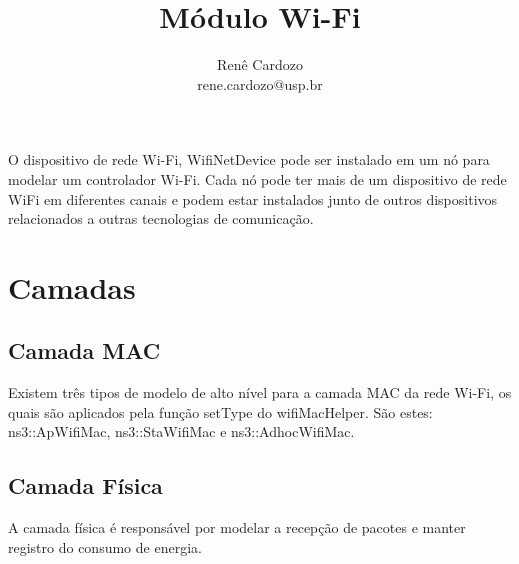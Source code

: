 \documentclass{article}
\author{Renê Cardozo \\ 
        rene.cardozo@usp.br}
\title{Módulo Wi-Fi}
\date{}
\begin{document}
\maketitle

O dispositivo de rede Wi-Fi, WifiNetDevice pode ser instalado em um nó para modelar um controlador Wi-Fi. Cada nó pode
ter mais de um dispositivo de rede WiFi em diferentes canais e podem estar instalados junto de outros dispositivos
relacionados a outras tecnologias de comunicação.

\section{Camadas}

\subsection{Camada MAC}
Existem três tipos de modelo de alto nível para a camada MAC da rede Wi-Fi, os quais são aplicados pela função setType
do wifiMacHelper. São estes: ns3::ApWifiMac, ns3::StaWifiMac e ns3::AdhocWifiMac. 

\subsection{Camada Física}

A camada física é responsável por modelar a recepção de pacotes e manter registro do consumo de energia.
\end{document}
